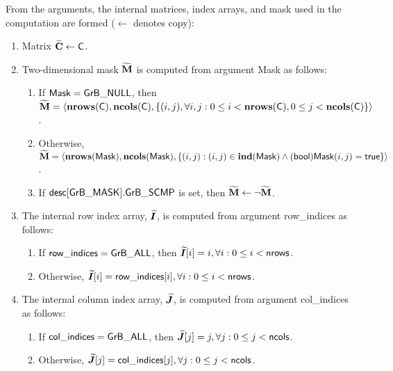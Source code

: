 From the arguments, the internal matrices, index arrays, and mask used in 
the computation are formed ($\leftarrow$ denotes copy):
\begin{enumerate}
	\item Matrix ${\bf \widetilde{C}} \leftarrow {\sf C}$.

	\item Two-dimensional mask ${\bf \widetilde{M}}$ is computed from 
    argument {\sf Mask} as follows:
	\begin{enumerate}

		\item	If ${\sf Mask} = {\sf GrB\_NULL}$, then ${\bf \widetilde{M}} = 
        \langle \bold{nrows}({\sf C}), \bold{ncols}({\sf C}), \{(i,j), 
        \forall i,j : 0 \leq i <  \bold{nrows}({\sf C}), 0 \leq j < 
        \bold{ncols}({\sf C}) \} \rangle$.

		\item	Otherwise, ${\bf \widetilde{M}} = \langle 
        \bold{nrows}({\sf Mask}), \bold{ncols}({\sf Mask}), \{(i,j) : 
        (i,j) \in \bold{ind}({\sf Mask}) \wedge 
        ({\sf bool}){\sf Mask}(i,j) = {\sf true}\} \rangle$.

		\item	If ${\sf desc[GrB\_MASK].GrB\_SCMP}$ is set, then 
        ${\bf \widetilde{M}} \leftarrow \neg {\bf \widetilde{M}}$.
	\end{enumerate}

    \item The internal row index array, $\bm{\widetilde{I}}$, is computed from 
    argument {\sf row\_indices} as follows:
	\begin{enumerate}
		\item	If ${\sf row\_indices} = {\sf GrB\_ALL}$, then 
        $\bm{\widetilde{I}}[i] = i, \forall i : 0 \leq i < {\sf nrows}$.

		\item	Otherwise, $\bm{\widetilde{I}}[i] = {\sf row\_indices}[i], 
        \forall i : 0 \leq i < {\sf nrows}$.
    \end{enumerate}
    
    \item The internal column index array, $\bm{\widetilde{J}}$, is computed from 
    argument {\sf col\_indices} as follows:
	\begin{enumerate}
		\item	If ${\sf col\_indices} = {\sf GrB\_ALL}$, then 
        $\bm{\widetilde{J}}[j] = j, \forall j : 0 \leq j < {\sf ncols}$.

		\item	Otherwise, $\bm{\widetilde{J}}[j] = {\sf col\_indices}[j], 
        \forall j : 0 \leq j < {\sf ncols}$.
    \end{enumerate}
\end{enumerate}

